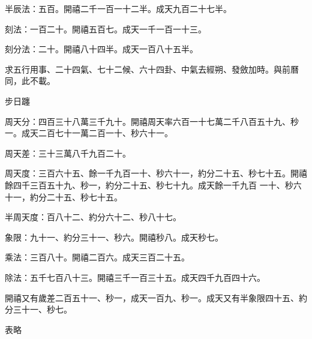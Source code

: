 \begin{pinyinscope}
 半辰法：五百。開禧二千一百一十二半。成天九百二十七半。



 刻法：一百二十。開禧五百七。成天一千一百一十三。



 刻分法：二十。開禧八十四半。成天一百八十五半。



 求五行用事、二十四氣、七十二候、六十四卦、中氣去經朔、發斂加時。與前曆同，此不載。



 步日躔



 周天分：四百三十八萬三千九十。開禧周天率六百一十七萬二千八百五十九、秒一。成天二百七十一萬二百一十、秒六十一。



 周天差：三十三萬八千九百二十。



 周天度：三百六十五、餘一千九百一十、秒六十一，約分二十五、秒七十五。開禧餘四千三百五十九、秒一，約分二十五、秒七十九。成天餘一千九百
 一十、秒六十一，約分二十五、秒七十五。



 半周天度：百八十二、約分六十二、秒八十七。



 象限：九十一、約分三十一、秒六。開禧秒八。成天秒七。



 乘法：三百八十。開禧二百六。成天三百二十五。



 除法：五千七百八十三。開禧三千一百三十五。成天四千九百四十六。



 開禧又有歲差二百五十一、秒一，成天一百九、秒一。成天又有半象限四十五、約分三十一、秒七。



 表略



\end{pinyinscope}